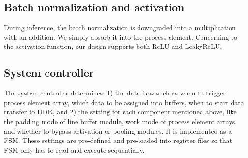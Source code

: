 \documentclass[conference]{IEEEtran}
\begin{document}
\subsection{Batch normalization and activation}
During inference, the batch normalization is downgraded into a multiplication with an addition. We simply absorb it into the process element. Concerning to the activation function, our design supports both ReLU and LeakyReLU.
\begin{comment}
This fulfills most of the neural networks for segmentation tasks, including U-Net, FCN, and SegNet.
\end{comment}

\subsection{System controller}
The system controller determines: 1) the data flow such as when to trigger process element array, which data to be assigned into buffers, when to start data transfer to DDR, and 2) the setting for each component mentioned above, like the padding mode of line buffer module, work mode of process element arrays, and whether to bypass activation or pooling modules. It is implemented as a FSM. These settings are pre-defined and pre-loaded into register files so that FSM only has to read and execute sequentially.
\end{document}
